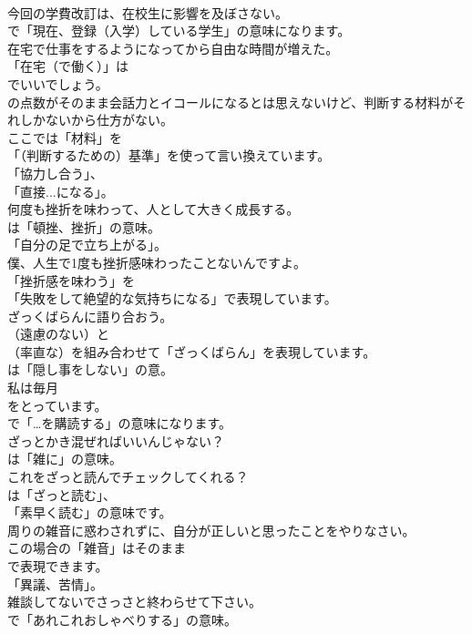 \documentclass[8pt]{extreport}
\begin{document}
\begin{CJK}{UTF8}{min}
\\	今回の学費改訂は、在校生に影響を及ぼさない。 
\\	で「現在、登録（入学）している学生」の意味になります。	
\\	在宅で仕事をするようになってから自由な時間が増えた。 
\\	「在宅（で働く）」は
\\	でいいでしょう。	
\\	の点数がそのまま会話力とイコールになるとは思えないけど、判断する材料がそれしかないから仕方がない。 
\\	ここでは「材料」を
\\	「（判断するための）基準」を使って言い換えています。
\\	「協力し合う」、
\\	「直接...になる」。	
\\	何度も挫折を味わって、人として大きく成長する。 
\\	は「頓挫、挫折」の意味。
\\	「自分の足で立ち上がる」。	
\\	僕、人生で1度も挫折感味わったことないんですよ。 
\\	「挫折感を味わう」を
\\	「失敗をして絶望的な気持ちになる」で表現しています。	
\\	ざっくばらんに語り合おう。 
\\	（遠慮のない）と 
\\	（率直な）を組み合わせて「ざっくばらん」を表現しています。
\\	は「隠し事をしない」の意。	
\\	私は毎月
\\	をとっています。 
\\	で「…を購読する」の意味になります。	
\\	ざっとかき混ぜればいいんじゃない？ 
\\	は「雑に」の意味。	
\\	これをざっと読んでチェックしてくれる？ 
\\	は「ざっと読む」、
\\	「素早く読む」の意味です。	
\\	周りの雑音に惑わされずに、自分が正しいと思ったことをやりなさい。 
\\	この場合の「雑音」はそのまま
\\	で表現できます。
\\	「異議、苦情」。	
\\	雑談してないでさっさと終わらせて下さい。 
\\	で「あれこれおしゃべりする」の意味。

\end{CJK}
\end{document}
